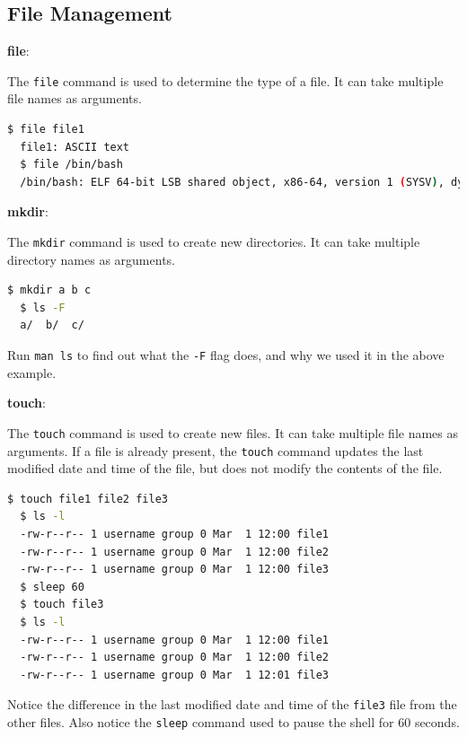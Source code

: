 \subsection{File Management}

\textbf{file}:

The \texttt{file} command is used to determine the type of a file.
It can take multiple file names as arguments.

\begin{lstlisting}[language=bash]
  $ file file1
  file1: ASCII text
  $ file /bin/bash
  /bin/bash: ELF 64-bit LSB shared object, x86-64, version 1 (SYSV), dynamically linked, interpreter /lib64/ld-linux-x86-64.so.2, for GNU/Linux 3.2.0, BuildID[sha1]=1234567890abcdef, stripped
\end{lstlisting}


\textbf{mkdir}:

The \texttt{mkdir} command is used to create new directories.
It can take multiple directory names as arguments.

\begin{lstlisting}[language=bash]
  $ mkdir a b c
  $ ls -F
  a/  b/  c/
\end{lstlisting}

\begin{exercise}
  Run \texttt{man ls} to find out what the \texttt{-F} flag does, and why we used it in the above example.
\end{exercise}

\textbf{touch}:

The \texttt{touch} command is used to create new files.
It can take multiple file names as arguments.
If a file is already present, the \texttt{touch} command updates the last modified date and time of the file, but does not modify the contents of the file.

\begin{lstlisting}[language=bash]
  $ touch file1 file2 file3
  $ ls -l
  -rw-r--r-- 1 username group 0 Mar  1 12:00 file1
  -rw-r--r-- 1 username group 0 Mar  1 12:00 file2
  -rw-r--r-- 1 username group 0 Mar  1 12:00 file3
  $ sleep 60
  $ touch file3
  $ ls -l
  -rw-r--r-- 1 username group 0 Mar  1 12:00 file1
  -rw-r--r-- 1 username group 0 Mar  1 12:00 file2
  -rw-r--r-- 1 username group 0 Mar  1 12:01 file3
\end{lstlisting}

\begin{exercise}
  Notice the difference in the last modified date and time of the \texttt{file3} file from the other files.
  Also notice the \texttt{sleep} command used to pause the shell for 60 seconds.
\end{exercise}

